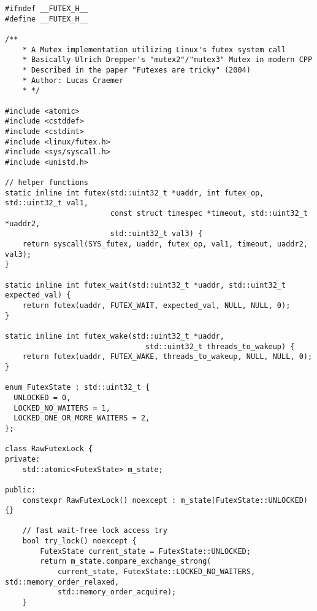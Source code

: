 \begin{lstlisting}[caption={Drepper's "mutex2/mutex3" in C++},label=append_futex]
#ifndef __FUTEX_H__
#define __FUTEX_H__

/**
    * A Mutex implementation utilizing Linux's futex system call
    * Basically Ulrich Drepper's "mutex2"/"mutex3" Mutex in modern CPP
    * Described in the paper "Futexes are tricky" (2004)
    * Author: Lucas Craemer
    * */

#include <atomic>
#include <cstddef>
#include <cstdint>
#include <linux/futex.h>
#include <sys/syscall.h>
#include <unistd.h>

// helper functions
static inline int futex(std::uint32_t *uaddr, int futex_op, std::uint32_t val1,
                        const struct timespec *timeout, std::uint32_t *uaddr2,
                        std::uint32_t val3) {
    return syscall(SYS_futex, uaddr, futex_op, val1, timeout, uaddr2, val3);
}

static inline int futex_wait(std::uint32_t *uaddr, std::uint32_t expected_val) {
    return futex(uaddr, FUTEX_WAIT, expected_val, NULL, NULL, 0);
}

static inline int futex_wake(std::uint32_t *uaddr,
                                std::uint32_t threads_to_wakeup) {
    return futex(uaddr, FUTEX_WAKE, threads_to_wakeup, NULL, NULL, 0);
}

enum FutexState : std::uint32_t {
  UNLOCKED = 0,
  LOCKED_NO_WAITERS = 1,
  LOCKED_ONE_OR_MORE_WAITERS = 2,
};

class RawFutexLock {
private:
    std::atomic<FutexState> m_state;
    
public:
    constexpr RawFutexLock() noexcept : m_state(FutexState::UNLOCKED) {}

    // fast wait-free lock access try
    bool try_lock() noexcept {
        FutexState current_state = FutexState::UNLOCKED;
        return m_state.compare_exchange_strong(
            current_state, FutexState::LOCKED_NO_WAITERS, std::memory_order_relaxed,
            std::memory_order_acquire);
    }


\end{lstlisting}
